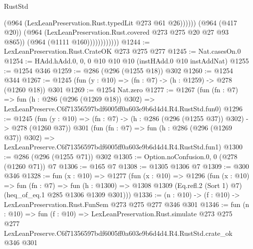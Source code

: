 \begin{lexlean}{RustStd}
\begin{coremodule}
                                (@964 (LexLeanPreservation.Rust.typedLit @273 @61 @26))))))
                        (@964 (@417 @20))
                        (@964 (LexLeanPreservation.Rust.covered @273 @275 @20 @27 @93 @865))
                        (@964 (@1111 @160))))))))))))
@1244 := LexLeanPreservation.Rust.CrateOK @273 @275 @277
@1245 := Nat.casesOn.{0}
@1254 := HAdd.hAdd.{0, 0, 0} @10 @10 @10 (instHAdd.{0} @10 instAddNat)
@1255 := @1254 @346
@1259 := @286 (@296 (@1255 @18)) @302
@1260 := @1254 @344
@1267 := @1245 (fun (y : @10) => (fn : @7) -> (h : @1259) -> @278 (@1260 @18)) @301
@1269 := @1254 Nat.zero
@1277 := @1267
    (fun (fn : @7) =>
    fun (h : @286 (@296 (@1269 @18)) @302) =>
    LexLeanPreserve.C6f71356597bdf6005ff0a603e9b6d4d4.R4.RustStd.fun0)
@1296 := @1245
    (fun (y : @10) => (fn : @7) -> (h : @286 (@296 (@1255 @37)) @302) -> @278 (@1260 @37))
    @301
    (fun (fn : @7) =>
    fun (h : @286 (@296 (@1269 @37)) @302) =>
    LexLeanPreserve.C6f71356597bdf6005ff0a603e9b6d4d4.R4.RustStd.fun1)
@1300 := @286 (@296 (@1255 @71)) @302
@1305 := Option.noConfusion.{0, 0} (@278 (@1260 @71)) @7
@1306 := @165 @7
@1308 := @1305 @1306 @7
@1309 := @300 @346
@1328 := fun (x : @10) =>
  @1277
    (fun (x : @10) =>
    @1296
      (fun (x : @10) =>
      fun (fn : @7) =>
      fun (h : @1300) =>
      @1308 @1309 (Eq.refl.{2} (Sort 1) @7) (heq_of_eq.{1} @285 @1306 @1309 @301)))
@1336 := (n : @10) -> (f : @10) -> LexLeanPreservation.Rust.FunSem @273 @275 @277 @346 @301
@1346 := fun (n : @10) =>
  fun (f : @10) =>
  LexLeanPreservation.Rust.simulate
    @273
    @275
    @277
    LexLeanPreserve.C6f71356597bdf6005ff0a603e9b6d4d4.R4.RustStd.crate_ok
    @346
    @301
\end{coremodule}
\end{lexlean}
